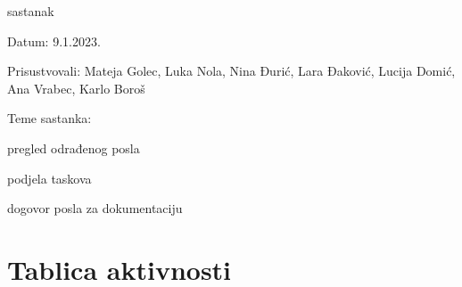 \begin{packed_enum}
			\item  sastanak
			\item[] \begin{packed_item}
				\item Datum: 9.1.2023.
				\item Prisustvovali: Mateja Golec, Luka Nola, Nina Đurić, Lara Đaković, Lucija Domić, Ana Vrabec, Karlo Boroš
				\item Teme sastanka:
				\begin{packed_item}
					\item  pregled odrađenog posla
					\item  podjela taskova
					\item  dogovor posla za dokumentaciju
				\end{packed_item}
			\end{packed_item}
		\end{packed_enum}
		
		\eject
		\section*{Tablica aktivnosti}
		

